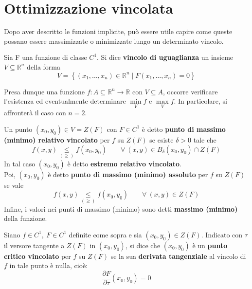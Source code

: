 \section{Ottimizzazione vincolata}
Dopo aver descritto le funzioni implicite, può essere utile capire come queste possano essere massimizzate o minimizzate lungo un determinato vincolo.
\begin{definition} \label{Def: Vincolo di uguaglianza}
Sia F una funzione di classe $C^1$. Si dice \textbf{vincolo di uguaglianza} un insieme $V \subseteq \mathbb{R}^n$ della forma
\begin{equation*}
    V= \left\{(x_1, \dots, x_n) \in \mathbb{R}^n \mid F(x_1, \dots, x_n)=0 \right\}
\end{equation*}
\end{definition}
Presa dunque una funzione $f:A\subseteq \mathbb{R}^n \to \mathbb{R}$ con $V \subseteq A$, occorre verificare l'esistenza ed eventualmente determinare $\min\limits_{V}{f}$ e $\max\limits_{V}{f}$.
In particolare, si affronterà il caso con $n=2$.
\begin{definition} \label{Def: Estremi vincolati}
    Un punto $(x_0, y_0) \in V= Z(F)$ con $F \in C^1$ è detto \textbf{punto di massimo (minimo) relativo vincolato} per $f$ su $Z(F)$ se esiste $\delta>0$ tale che 
    \begin{equation*}
        f(x,y) \underset{(\geq)}{\leq} f(x_0, y_0) \qquad \forall\ (x, y) \in B_\delta(x_0, y_0) \cap Z(F)
    \end{equation*}
    In tal caso $(x_0, y_0)$ è detto \textbf{estremo relativo vincolato}.\\
    Poi, $(x_0, y_0)$ è detto \textbf{punto di massimo (minimo) assoluto} per $f$ su $Z(F)$ se vale
    \begin{equation*}
        f(x, y) \underset{(\geq)}{\leq} f(x_0, y_0) \qquad \forall\ (x, y) \in Z(F)
    \end{equation*}
    Infine, i valori nei punti di massimo (minimo) sono detti \textbf{massimo (minimo)} della funzione.
\end{definition}
\begin{definition} \label{Punto critico vincolato}
    Siano $f \in C^1,\ F \in C^1$ definite come sopra e sia $(x_0, y_0) \in Z(F)$. Indicato con $\tau$ il versore tangente a $Z(F)$ in $(x_0, y_0)$, si dice che $(x_0, y_0)$ è un \textbf{punto critico vincolato} per $f$ su $Z(F)$ se la sua \textbf{derivata tangenziale} al vincolo di $f$ in tale punto è nulla, cioè:
    \begin{equation} \label{Eq: Derivata tangenziale}
        \frac{\partial{F}}{\partial \tau}(x_0, y_0)=0 
    \end{equation}
\end{definition}
